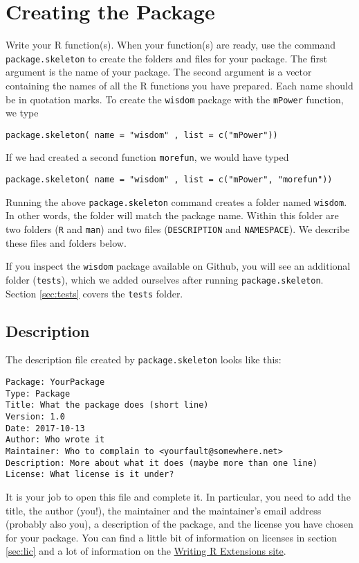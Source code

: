 \documentclass{article}
\begin{document}
\section{Creating the Package}
Write your R function(s). When your function(s) are ready, use the command \texttt{package.skeleton} to create the folders and files for your package. The first argument is  the name of your package. The second argument is a vector containing the names of all the R functions you have prepared. Each name should be in quotation marks. To create the \texttt{wisdom} package with the \texttt{mPower} function, we type
\begin{verbatim}
package.skeleton( name = "wisdom" , list = c("mPower"))
\end{verbatim}
If we had created a second function \texttt{morefun}, we would have typed
\begin{verbatim}
package.skeleton( name = "wisdom" , list = c("mPower", "morefun"))
\end{verbatim}
Running the above \texttt{package.skeleton} command  creates a folder named \texttt{wisdom}. In other words, the folder will match the package name.
Within this folder are two folders (\texttt{R} and \texttt{man}) and two files (\texttt{DESCRIPTION} and \texttt{NAMESPACE}). We describe these files and folders below.

If you inspect the \texttt{wisdom} package available on Github, you will see an additional folder (\texttt{tests}), which we added ourselves after running  \texttt{package.skeleton}. Section \ref{sec:tests} covers the \texttt{tests} folder.




\subsection{Description}
The description file created by  \texttt{package.skeleton} looks like this:
\begin{verbatim}
Package: YourPackage
Type: Package
Title: What the package does (short line)
Version: 1.0
Date: 2017-10-13
Author: Who wrote it
Maintainer: Who to complain to <yourfault@somewhere.net>
Description: More about what it does (maybe more than one line)
License: What license is it under?
\end{verbatim}
It is your job to open this file and complete it. In particular, you need to add the title, the author (you!), the maintainer and the maintainer's email address (probably also you), a description of the package, and the license you have chosen for your package. You can find a little bit of information on licenses in section \ref{sec:lic} and a lot of information on the \href{https://cran.r-project.org/doc/manuals/R-exts.html#Licensing}{Writing R Extensions site}. \\
\end{document}
